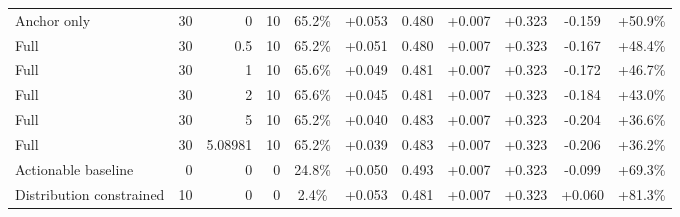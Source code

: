 \begin{table}[htbp]
\begin{tabular}{lrrrccccccc}
Anchor only & 30 & 0 & 10 & 65.2\% & +0.053 & 0.480 & +0.007 & +0.323 & -0.159 & +50.9\% \\
Full & 30 & 0.5 & 10 & 65.2\% & +0.051 & 0.480 & +0.007 & +0.323 & -0.167 & +48.4\% \\
Full & 30 & 1 & 10 & 65.6\% & +0.049 & 0.481 & +0.007 & +0.323 & -0.172 & +46.7\% \\
Full & 30 & 2 & 10 & 65.6\% & +0.045 & 0.481 & +0.007 & +0.323 & -0.184 & +43.0\% \\
Full & 30 & 5 & 10 & 65.2\% & +0.040 & 0.483 & +0.007 & +0.323 & -0.204 & +36.6\% \\
Full & 30 & 5.08981 & 10 & 65.2\% & +0.039 & 0.483 & +0.007 & +0.323 & -0.206 & +36.2\% \\
Actionable baseline & 0 & 0 & 0 & 24.8\% & +0.050 & 0.493 & +0.007 & +0.323 & -0.099 & +69.3\% \\
Distribution constrained & 10 & 0 & 0 & 2.4\% & +0.053 & 0.481 & +0.007 & +0.323 & +0.060 & +81.3\% \\
\bottomrule
\end{tabular}
\end{table}